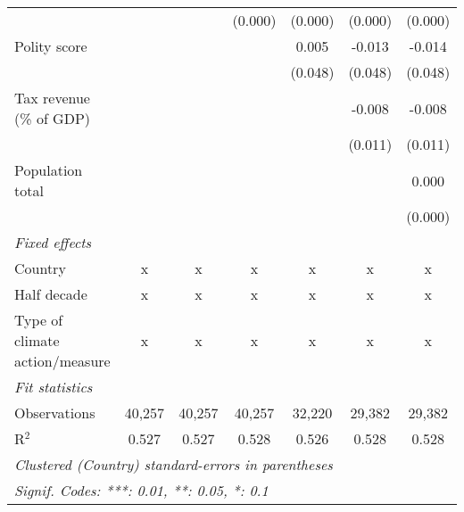 \begin{tabular}{lcccccc}
                                                                                    &         &               & (0.000)       & (0.000)       & (0.000)       & (0.000)\\   
   Polity score                                                                     &         &               &               & 0.005         & -0.013        & -0.014\\   
                                                                                    &         &               &               & (0.048)       & (0.048)       & (0.048)\\   
   Tax revenue (\% of GDP)                                                          &         &               &               &               & -0.008        & -0.008\\   
                                                                                    &         &               &               &               & (0.011)       & (0.011)\\   
   Population total                                                                 &         &               &               &               &               & 0.000\\   
                                                                                    &         &               &               &               &               & (0.000)\\   
   \emph{Fixed effects}\\
   Country                                                                          & x       & x             & x             & x             & x             & x\\  
   Half decade                                                                      & x       & x             & x             & x             & x             & x\\  
   Type of climate action/measure                                                   & x       & x             & x             & x             & x             & x\\  
   \midrule \emph{Fit statistics}\\
   Observations                                                                     & 40,257  & 40,257        & 40,257        & 32,220        & 29,382        & 29,382\\  
   R$^2$                                                                            & 0.527   & 0.527         & 0.528         & 0.526         & 0.528         & 0.528\\  
   \midrule
   \multicolumn{7}{l}{\emph{Clustered (Country) standard-errors in parentheses}}\\
   \multicolumn{7}{l}{\emph{Signif. Codes: ***: 0.01, **: 0.05, *: 0.1}}\\
\end{tabular}
\par\endgroup


